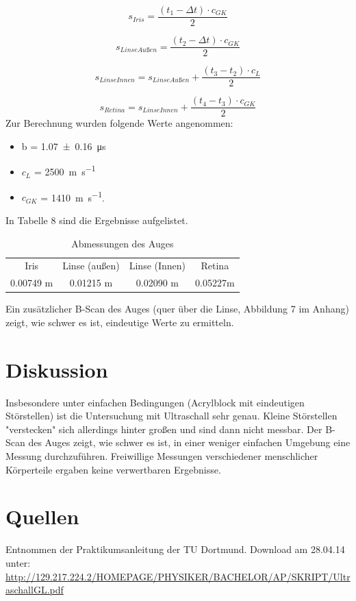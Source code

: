 \documentclass[11pt,ngerman,a4paper]{article}
\begin{document}
\begin{equation}
s_{Iris}=\frac{(t_1-\Delta t)\cdot c_{GK}}{2}
\end{equation}

\begin{equation}
s_{LinseAußen}=\frac{(t_2-\Delta t)\cdot c_{GK}}{2}
\end{equation}

\begin{equation}
s_{LinseInnen}=s_{LinseAußen}+\frac{(t_3-t_2)\cdot c_L}{2}
\end{equation}

\begin{equation}
s_{Retina}=s_{LinseInnen}+\frac{(t_4-t_3)\cdot c_{GK}}{2}
\end{equation}
\newpage
Zur Berechnung wurden folgende Werte angenommen:
\begin{itemize}
\item b =  \SI{1.07\pm0.16}{\micro\second}
\item $c_{L}$ = \SI{2500}{\metre\per\second}
\item $c_{GK}$ = \SI{1410}{\metre\per\second}.
\end{itemize}
In Tabelle 8 sind die Ergebnisse aufgelistet.
\begin{table}[h]
\centering
 \begin{tabular}{|c|c|c|c|}
 Iris & Linse (außen) & Linse (Innen) & Retina \\
0.00749 m & 0.01215 m & 0.02090 m & 0.05227m \\
 \end{tabular}
\label{7}
\caption{Abmessungen des Auges}
\end{table}
\newline
Ein zusätzlicher B-Scan des Auges (quer über die Linse, Abbildung 7 im Anhang) zeigt, wie schwer es ist, eindeutige Werte zu ermitteln.

\section{Diskussion}
Insbesondere unter einfachen Bedingungen (Acrylblock mit eindeutigen Störstellen) ist die Untersuchung mit Ultraschall sehr genau. Kleine Störstellen "verstecken" sich allerdings hinter großen und sind dann nicht messbar. Der B-Scan des Auges zeigt, wie schwer es ist, in einer weniger einfachen Umgebung eine Messung durchzuführen. Freiwillige Messungen verschiedener menschlicher Körperteile ergaben keine verwertbaren Ergebnisse.

\section{Quellen}
\begin{enumerate}[{[}1{]}]
\item Entnommen der Praktikumsanleitung \textit{} der TU Dortmund. Download am 28.04.14 unter:\\
 \url{http://129.217.224.2/HOMEPAGE/PHYSIKER/BACHELOR/AP/SKRIPT/UltraschallGL.pdf}
\end{enumerate}
\end{document}
